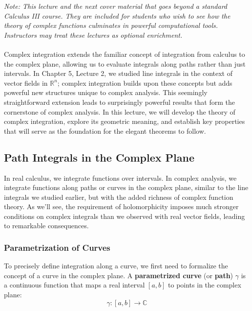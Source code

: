 \newpage

 

\noindent \textit{Note: This lecture and the next cover material that goes beyond a standard Calculus III course. They are included for students who wish to see how the theory of complex functions culminates in powerful computational tools. Instructors may treat these lectures as optional enrichment.}\\ \\

\noindent Complex integration extends the familiar concept of integration from calculus to the complex plane, allowing us to evaluate integrals along paths rather than just intervals. In Chapter 5, Lecture 2, we studied line integrals in the context of vector fields in $\mathbb{R}^n$; complex integration builds upon these concepts but adds powerful new structures unique to complex analysis. This seemingly straightforward extension leads to surprisingly powerful results that form the cornerstone of complex analysis. In this lecture, we will develop the theory of complex integration, explore its geometric meaning, and establish key properties that will serve as the foundation for the elegant theorems to follow.

\subsection*{Path Integrals in the Complex Plane} 

\noindent In real calculus, we integrate functions over intervals. In complex analysis, we integrate functions along paths or curves in the complex plane, similar to the line integrals we studied earlier, but with the added richness of complex function theory. As we'll see, the requirement of holomorphicity imposes much stronger conditions on complex integrals than we observed with real vector fields, leading to remarkable consequences.

\subsubsection*{Parametrization of Curves}

\noindent To precisely define integration along a curve, we first need to formalize the concept of a curve in the complex plane. A \textbf{parametrized curve} (or \textbf{path}) $\gamma$ is a continuous function that maps a real interval $[a,b]$ to points in the complex plane:
\[
\gamma: [a,b] \to \mathbb{C}
\]

